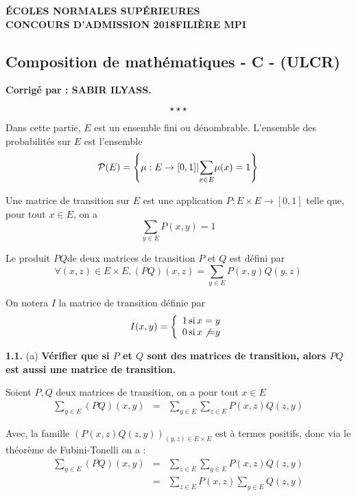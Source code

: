 \begin{center}
\textbf{ÉCOLES NORMALES SUPÉRIEURES}\\
\textbf{CONCOURS D'ADMISSION 2018\hspace{11em}FILIÈRE MPI}\\
\subsection*{Composition de mathématiques - C - (ULCR)}\label{mathC_2018}
\textbf{Corrigé par : SABIR ILYASS.}
\end{center}
\[
\star \star \star
\]

\begin{center}
  {}
\end{center}

Dans cette partie, $E$ est un ensemble fini ou d{\'e}nombrable. L'ensemble des
probabilit{\'e}s sur $E$ est l'ensemble
\[ \mathcal{P} (E) = \left\{ \mu : E \rightarrow [0, 1]  |  
   \underset{x \in E}{\sum} \mu (x) = 1 \right\} \]


Une matrice de transition sur $E$ est une application $P : E \times E
\rightarrow [0, 1]$ telle que, pour tout $x \in E$, on a
\[ \underset{y \in E}{\sum} P (x, y) = 1 \]


Le produit $P Q$de deux matrices de transition $P$ et $Q$ est d{\'e}fini par
\[ \forall (x, z) \in E \times E, (P Q) (x, z) = \underset{y \in E}{\sum} P
   (x, y) Q (y, z) \]


On notera $I$ la matrice de transition d{\'e}finie par
\[ I (x, y) = \left\{\begin{array}{l}
     1 \operatorname{si} x = y\\
     0 \operatorname{si} x \not{=} y
   \end{array}\right. \]


\textbf{1.1.} (a) \textbf{Vérifier que si $P$ et $Q$ sont des matrices de transition, alors $PQ$ est aussi une matrice de transition.}


Soient $P, Q$ deux matrices de transition, on a pour tout $x \in E$
\begin{eqnarray*}
  \underset{y \in E}{\sum} (P Q) (x, y) & = & \underset{y \in E}{\sum}
  \underset{z \in E}{\sum} P (x, z) Q (z, y)
\end{eqnarray*}


Avec, la famille $(P (x, z) Q (z, y))_{(y, z) \in E \times E}$ est {\`a}
termes positifs, donc via le th{\'e}or{\`e}me de Fubini-Tonelli on a :
\begin{eqnarray*}
  \underset{y \in E}{\sum} (P Q) (x, y) & = & \underset{z \in E}{\sum}
  \underset{y \in E}{\sum} P (x, z) Q (z, y)\\
  & = & \underset{z \in E}{\sum} P (x, z) \underset{y \in E}{\sum} Q (z, y)
\end{eqnarray*}


